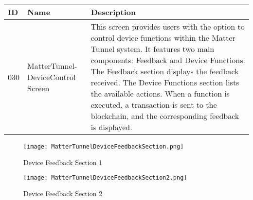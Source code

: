 \documentclass[conference]{IEEEtran}
\begin{document}
\begin{enumerate}[itemsep=2ex, parsep=1ex]
\begin{enumerate}[itemsep=2ex, parsep=1ex]
	      	      \begin{table}[h!]
	      	      	\def\arraystretch{1.24} \small
	      	      	\begin{tabular}{|p{0.5cm}|p{1.8cm}|p{5.4cm}|}
	      	      		\hline
	      	      		ID  & Name                              & Description                                                                                                                                                                                                                                                                                                                                                                                                                                                                                                                                                   \\
	      	      		\hline
	      	      		030 & MatterTunnel-DeviceControl Screen & This screen provides users with the option to control device functions within the Matter Tunnel system. It features two main components: Feedback and Device Functions. The Feedback section displays the feedback received. The Device Functions section lists the available actions. When a function is executed, a transaction is sent to the blockchain, and the corresponding feedback is displayed.\\
	      	      		\hline
	      	      	\end{tabular}
	      	      \end{table}

                  \clearpage
	      	      
	      	      \begin{figure}[h!]
	      	      	\centering
	      	      	\texttt{[image: MatterTunnelDeviceFeedbackSection.png]}
	      	      	\caption{Device Feedback Section 1}
	      	      	\label{fig:DeviceFeedbackSection1}
	      	      \end{figure}
	      	      
	      	      \begin{figure}[h!]
	      	      	\centering
	      	      	\texttt{[image: MatterTunnelDeviceFeedbackSection2.png]}
	      	      	\caption{Device Feedback Section 2}
	      	      	\label{fig:DeviceFeedbackSection2}
	      	      \end{figure}
	      	      	      	      

\end{enumerate}
\end{enumerate}
\end{document}
